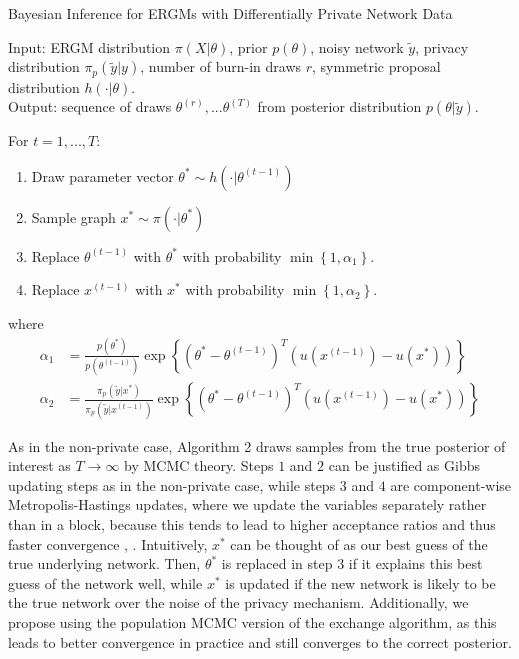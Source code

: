\begin{algorithm}[!ht]
	\label{alg:privinf}
	\caption{Bayesian Inference for ERGMs with Differentially Private Network Data}
	Input: ERGM distribution $\pi(X | \theta)$, prior $p(\theta)$, noisy network $\tilde{y}$, privacy distribution $\pi_p(\tilde{y} | y)$, number of burn-in draws $r$, symmetric proposal distribution $h(\cdot | \theta)$. \\
	Output: sequence of draws $\theta^{(r)},...\theta^{(T)}$ from posterior distribution $p(\theta | \tilde{y})$.
	
	\vspace{0.1in}
	For {$ t = 1,...,T$}:
	\begin{enumerate}
		\item  Draw parameter vector $\theta^* \sim h(\cdot | \theta^{(t-1)})$
		\item Sample graph $x^* \sim \pi(\cdot | \theta^*)$
		\item Replace $\theta^{(t-1)}$ with $\theta^*$ with probability $\min\left\{1, \alpha_1\right\}$.
		\item Replace $x^{(t-1)}$ with $x^*$ with probability $\min\left\{1, \alpha_2\right\}$.
	\end{enumerate}
	where \begin{align*}
	\alpha_1 &= \frac{p(\theta^*)}{p(\theta^{(t-1)})} \exp\left\{\left(\theta^* - \theta^{(t-1)}\right)^T\left(u(x^{(t-1)}) - u(x^*)\right) \right\} \\
	\alpha_2 & = \frac{\pi_p(\tilde{y} | x^*) }{\pi_p(\tilde{y} | x^{(t-1)})} \exp\left\{\left(\theta^* - \theta^{(t-1)}\right)^T\left(u(x^{(t-1)}) - u(x^*)\right) \right\} 
	\end{align*}
\end{algorithm}

As in the non-private case, Algorithm 2 draws samples from the true posterior of interest as $T \to \infty$ by MCMC theory. Steps $1$ and $2$ can be justified as Gibbs updating steps as in the non-private case, while steps $3$ and $4$ are component-wise Metropolis-Hastings updates, where we update the variables separately rather than in a block, because this tends to lead to higher acceptance ratios and thus faster convergence \cite{GL06}, \cite{LM14}. Intuitively, $x^*$ can be thought of as our best guess of the true underlying network. Then, $\theta^*$ is replaced in step $3$ if it explains this best guess of the network well, while $x^*$ is updated if the new network is likely to be the true network over the noise of the privacy mechanism. Additionally, we propose using the population MCMC version of the exchange algorithm, as this leads to better convergence in practice and still converges to the correct posterior.

